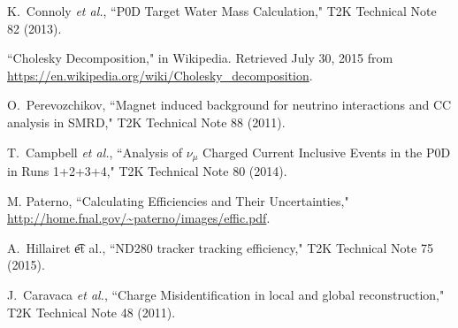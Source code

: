 \begin{thebibliography}{30}
 K.~Connoly {\it et al.},
``P0D Target Water Mass Calculation,"
T2K Technical Note 82 (2013).

 ``Cholesky Decomposition," in Wikipedia. Retrieved July 30, 2015 from \url{https://en.wikipedia.org/wiki/Cholesky_decomposition}.

 O.~Perevozchikov,
``Magnet induced background for neutrino interactions and CC analysis in SMRD,"
T2K Technical Note 88 (2011).

 T.~Campbell {\it et al.},
``Analysis of $\nu_\mu$ Charged Current Inclusive Events in the P0D in Runs 1+2+3+4,"
T2K Technical Note 80 (2014).

M. Paterno, ``Calculating Efficiencies and Their Uncertainties," \url{http://home.fnal.gov/~paterno/images/effic.pdf}.

 A.~Hillairet {\t et al.},
``ND280 tracker tracking efficiency,"
T2K Technical Note 75 (2015).

 J.~Caravaca {\it et al.},
``Charge Misidentification in local and global reconstruction,"
T2K Technical Note 48 (2011).

\end{thebibliography}